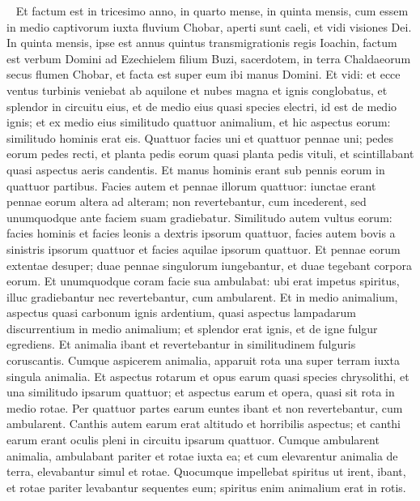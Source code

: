 
\begin{biblechapter}   
\verse Et factum est in tricesimo anno, in quarto mense, in quinta mensis, cum essem in medio captivorum iuxta fluvium Chobar, aperti sunt caeli, et vidi visiones Dei. 
\verse In quinta mensis, ipse est annus quintus transmigrationis regis Ioachin, 
\verse factum est verbum Domini ad Ezechielem filium Buzi, sacerdotem, in terra Chaldaeorum secus flumen Chobar, et facta est super eum ibi manus Domini. 
\verse Et vidi: et ecce ventus turbinis veniebat ab aquilone et nubes magna et ignis conglobatus, et splendor in circuitu eius, et de medio eius quasi species electri, id est de medio ignis; 
\verse et ex medio eius similitudo quattuor animalium, et hic aspectus eorum: similitudo hominis erat eis. 
\verse Quattuor facies uni et quattuor pennae uni; 
\verse pedes eorum pedes recti, et planta pedis eorum quasi planta pedis vituli, et scintillabant quasi aspectus aeris candentis. 
\verse Et manus hominis erant sub pennis eorum in quattuor partibus. Facies autem et pennae illorum quattuor: 
\verse iunctae erant pennae eorum altera ad alteram; non revertebantur, cum incederent, sed unumquodque ante faciem suam gradiebatur. 
\verse Similitudo autem vultus eorum: facies hominis et facies leonis a dextris ipsorum quattuor, facies autem bovis a sinistris ipsorum quattuor et facies aquilae ipsorum quattuor. 
\verse Et pennae eorum extentae desuper; duae pennae singulorum iungebantur, et duae tegebant corpora eorum. 
\verse Et unumquodque coram facie sua ambulabat: ubi erat impetus spiritus, illuc gradiebantur nec revertebantur, cum ambularent. 
\verse Et in medio animalium, aspectus quasi carbonum ignis ardentium, quasi aspectus lampadarum discurrentium in medio animalium; et splendor erat ignis, et de igne fulgur egrediens. 
\verse Et animalia ibant et revertebantur in similitudinem fulguris coruscantis. 
\verse Cumque aspicerem animalia, apparuit rota una super terram iuxta singula animalia. 
\verse Et aspectus rotarum et opus earum quasi species chrysolithi, et una similitudo ipsarum quattuor; et aspectus earum et opera, quasi sit rota in medio rotae. 
\verse Per quattuor partes earum euntes ibant et non revertebantur, cum ambularent. 
\verse Canthis autem earum erat altitudo et horribilis aspectus; et canthi earum erant oculis pleni in circuitu ipsarum quattuor. 
\verse Cumque ambularent animalia, ambulabant pariter et rotae iuxta ea; et cum elevarentur animalia de terra, elevabantur simul et rotae. 
\verse Quocumque impellebat spiritus ut irent, ibant, et rotae pariter levabantur sequentes eum; spiritus enim animalium erat in rotis. 

\end{biblechapter}
